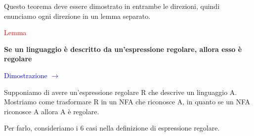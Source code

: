 \documentclass{article}
\begin{document}
\noindent Questo teorema deve essere dimostrato in entrambe le direzioni, quindi
enunciamo ogni direzione in un lemma separato.

\begin{center}
    \textcolor{red}{Lemma}

    \textbf{Se un linguaggio è descritto da un'espressione regolare, allora esso è regolare}
\end{center}

\textcolor{blue}{Dimostrazione $\rightarrow$}

Supponiamo di avere un'espressione regolare R che descrive un linguaggio A.
Mostriamo come trasformare R in un NFA che riconosce A, in quanto se un NFA
riconosce A allora A è regolare.

Per farlo, consideriamo i 6 casi nella definizione di espressione regolare.
\end{document}
